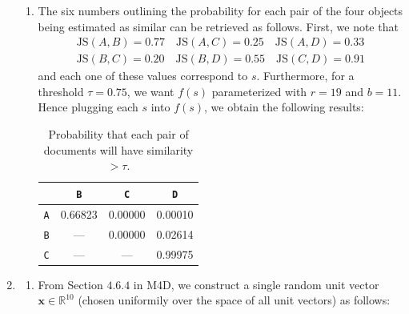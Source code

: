 \documentclass{article}
\begin{document}
\begin{enumerate}[leftmargin={*}, font={\bf}, label={\arabic*.}, ref={\arabic*}]
\begin{enumerate}[label={(\Alph*)}, ref={\theenumi(\Alph*)}]
      \item \label{qst:1B}
        The six numbers outlining the probability for each pair of the four objects being
        estimated as similar can be retrieved as follows. First, we note that
        \begin{gather*}
          \text{JS}(A,B) = 0.77 \quad \text{JS}(A,C) = 0.25 \quad \text{JS}(A,D) = 0.33 \\
          \text{JS}(B,C) = 0.20 \quad \text{JS}(B,D) = 0.55 \quad \text{JS}(C,D) = 0.91
        \end{gather*}
        and each one of these values correspond to $s$. Furthermore, for a threshold $\tau=
        0.75$, we want $f(s)$ parameterized with $r=19$ and $b=11$. Hence plugging each $s$
        into $f(s)$, we obtain the following results:
        \begin{table}[H]
          \centering
          \begin{tabular}{|cccc|}
            \hline
            & {\tt B} & {\tt C} & {\tt D} \\ \hline \hline
            {\tt A} & 0.66823 & 0.00000 & 0.00010 \\ \hline
            {\tt B} & --- & 0.00000 & 0.02614 \\ \hline
            {\tt C} & --- & --- & 0.99975 \\ \hline
          \end{tabular}
          \caption{
            Probability that each pair of documents will have similarity $> \tau$.
          }
          \label{tbl:build-ngram-table}
        \end{table}
    \end{enumerate}

  \item \label{qst:2}
    \begin{enumerate}[label={(\Alph*)}, ref={\theenumi(\Alph*)}]
      \item \label{qst:2A}
        From Section $4.6.4$ in M4D, we construct a single random unit vector $\bm{x}
        \in \mathbb{R}^{10}$ (chosen uniformily over the space of all unit vectors) as
        follows:


\end{enumerate}
\end{enumerate}
\end{document}
